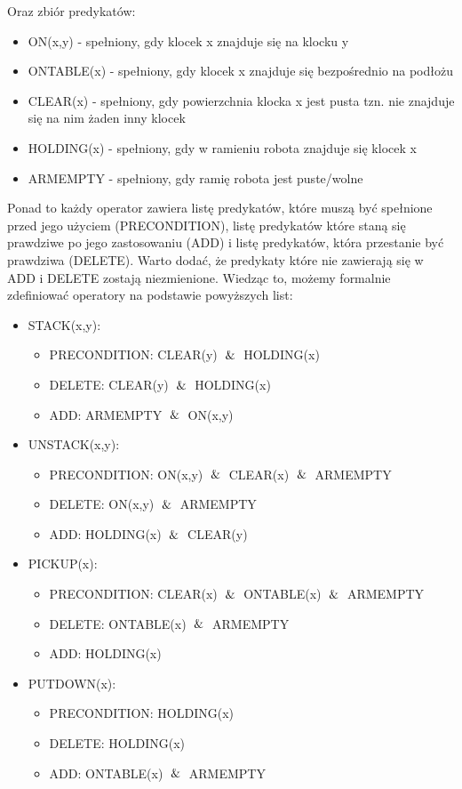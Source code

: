 \documentclass{article}
\begin{document}
Oraz zbiór predykatów:
\begin{itemize}
    \item ON(x,y) - spełniony, gdy klocek x znajduje się na klocku y
    \item ONTABLE(x) - spełniony, gdy klocek x znajduje się bezpośrednio na podłożu
    \item CLEAR(x) - spełniony, gdy powierzchnia klocka x jest pusta tzn. nie znajduje się na nim żaden inny klocek
    \item HOLDING(x) - spełniony, gdy w ramieniu robota znajduje się klocek x
    \item ARMEMPTY - spełniony, gdy ramię robota jest puste/wolne
\end{itemize}
Ponad to każdy operator zawiera listę predykatów, które muszą być spełnione przed jego użyciem (PRECONDITION), listę predykatów które staną się prawdziwe po jego zastosowaniu (ADD) i listę predykatów, która przestanie być prawdziwa (DELETE). Warto dodać, że predykaty które nie zawierają się w ADD i DELETE zostają niezmienione. Wiedząc to, możemy formalnie zdefiniować operatory na podstawie powyższych list:
\begin{itemize}
    \item STACK(x,y):
    \begin{itemize}
        \item PRECONDITION: CLEAR(y) $\And$ HOLDING(x)
        \item DELETE: CLEAR(y) $\And$ HOLDING(x)
        \item ADD: ARMEMPTY $\And$ ON(x,y)
    \end{itemize}
    \item UNSTACK(x,y):
    \begin{itemize}
        \item PRECONDITION: ON(x,y) $\And$ CLEAR(x) $\And$ ARMEMPTY
        \item DELETE: ON(x,y) $\And$ ARMEMPTY
        \item ADD: HOLDING(x) $\And$ CLEAR(y)
    \end{itemize}
        \item PICKUP(x):
    \begin{itemize}
        \item PRECONDITION: CLEAR(x) $\And$ ONTABLE(x) $\And$ ARMEMPTY
        \item DELETE: ONTABLE(x) $\And$ ARMEMPTY
        \item ADD: HOLDING(x)
    \end{itemize}
    \item PUTDOWN(x):
    \begin{itemize}
        \item PRECONDITION: HOLDING(x)
        \item DELETE: HOLDING(x)
        \item ADD: ONTABLE(x) $\And$ ARMEMPTY
    \end{itemize}
\end{itemize}
\end{document}
